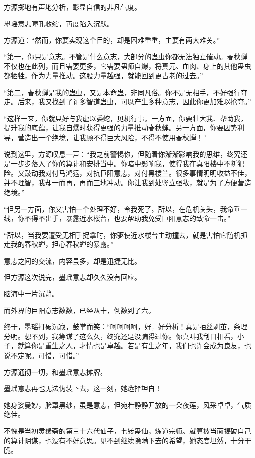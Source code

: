 \begin{this_body}
方源掷地有声地分析，彰显自信的非凡气度。

墨瑶意志瞳孔收缩，再度陷入沉默。

方源道：“然而，你要实现这个目的，却是困难重重，主要有两大难关。”

“第一，你只是意志。不管是什么意志，大部分的蛊虫你都无法独立催动。春秋蝉不仅也在此列，而且需要更多，它需要蛊师自爆，将真元、血肉、身上的其他蛊虫都牺牲，作为力量推动。这股力量越强，就能回到更古老的过去。”

“第二，春秋蝉是我的蛊虫，又是本命蛊，非同凡俗。你不是无相手，不好强行夺走。后来，我又找到了许多智道蛊虫，可以产生多种意志，因此你更加难以抢夺。”

“这样一来，你就只好与我虚以委蛇，见机行事。一方面，你要壮大我、帮助我，提升我的底蕴，让我自爆时获得更强的力量推动春秋蝉。另一方面，你要因势利导，营造出一个绝境，让我顾不得巨大风险，不得不使用春秋蝉！”

说到这里，方源叹息一声：“我之前警惕你，但随着你渐渐影响我的思维，终究还是一步步落入了你的算计和安排当中。你暗中影响我，使得我在真阳楼中不断犯险。又鼓动我对付马鸿运，对抗巨阳意志，对付黑楼兰。很多事情明明收益不佳，并不理智，我却一而再，再而三地冲动。你让我到处竖立强敌，就是为了方便营造绝境。”

“但另一方面，你又害怕一个处理不好，令我死了。所以，在危机关头，我命垂一线，你不得不出手，暴露近水楼台，也要帮助我免受巨阳意志的致命一击。”

“所以，当我要遭受无相手捉拿时，你驱使近水楼台主动撞去，就是害怕它随机抓走我的春秋蝉，担心春秋蝉的暴露。”

意志之间的交流，内容虽多，却是迅捷无比。

但方源这次说完，墨瑶意志却久久没有回应。

脑海中一片沉静。

而外界的巨阳意志数数，已经从十，倒数到了六。

终于，墨瑶打破沉寂，鼓掌而笑：“呵呵呵呵，好，好分析！真是抽丝剥茧，条理分明。想不到，我筹谋了这么久，终究还是没骗得过你。你真叫我刮目相看，小子，就算你是重生之人，才情也是卓越。若是有生之年，我们也许会成为良友，也说不定呢。可惜，可惜。”

方源通彻一切，和墨瑶意志摊牌。

墨瑶意志再也无法伪装下去，这一刻，她选择坦白！

她身姿曼妙，脸罩黑纱，虽是意志，但宛若静静开放的一朵夜莲，风采卓卓，气质绝佳。

不愧是当初灵缘斋的第三十六代仙子，七转蛊仙，炼道宗师。就算被当面揭破自己的算计阴谋，也没有不好意思。见不到继续隐瞒下去的希望，她态度坦然，十分干脆。


\end{this_body}

